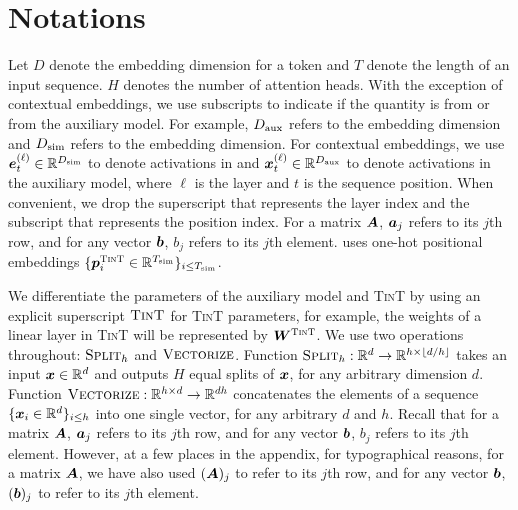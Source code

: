 

\section{Notations}\label{sec:additional_notations}
Let $D$ denote the embedding dimension for a token and $T$ denote the length of an input sequence. 
$H$ denotes the number of attention heads. 
With the exception of contextual embeddings, we use subscripts to indicate if the quantity is from \simulator{} or from the auxiliary model. For example, $D_{\text{aux}}$ refers to the embedding dimension and $D_{\text{sim}}$ refers to the \simulator{} embedding dimension.
For contextual embeddings, we use $\ve_t^{(\ell)}\in\RR^{\simu{D}}$ to denote activations in \simulator{} and ${\bm{x}}_t^{(\ell)}\in\mathbb{R}^{D_{\text{aux}}}$ to denote activations in the auxiliary model, where $\ell$ is the layer and $t$ is the sequence position. When convenient, we drop the superscript that represents the layer index and the subscript that represents the position index. For a matrix ${\bm{A}}$, ${\bm{a}}_j$ refers to its $j$th row, and for any vector ${\bm{b}}$, $b_j$ refers to its $j$th element. \simulator{} uses one-hot positional embeddings $\{ {{\bm{p}}}^{\textsc{TinT}}_i \in \mathbb{R}^{T_{\text{sim}}} \}_{i \le T_{\text{sim}} }$.

We differentiate the parameters of the auxiliary model and \textsc{TinT} by using an explicit superscript $\textsc{TinT}$ for \textsc{TinT} parameters, for example, the weights of a linear layer in \textsc{TinT} will be represented by ${{\bm{W}}}^{\textsc{TinT}}$. We use two operations throughout: $\textsc{Split}_h$ and $\textsc{Vectorize}$. Function $\textsc{Split}_h: \mathbb{R}^{d} \to \mathbb{R}^{h \times  \lfloor d/h \rfloor  }$ takes an input ${\bm{x}} \in \mathbb{R}^d$ and outputs $H$ equal splits of ${\bm{x}}$, for any arbitrary dimension $d$.  Function $\textsc{Vectorize}:  \mathbb{R}^{h \times d} \to \mathbb{R}^{dh}$ concatenates the elements of a sequence $\{{\bm{x}}_i \in \mathbb{R}^{d}\}_{i \le h}$ into one single vector, for any arbitrary $d$ and $h$. Recall that for a matrix ${\bm{A}}$, ${\bm{a}}_j$ refers to its $j$th row, and for any vector ${\bm{b}}$, $b_j$ refers to its $j$th element. However, at a few places in the appendix, for typographical reasons, for a matrix ${\bm{A}}$, we have also used $({\bm{A}})_j$  to refer to its $j$th row, and for any vector ${\bm{b}}$, $({\bm{b}})_j$ to refer to its $j$th element.




